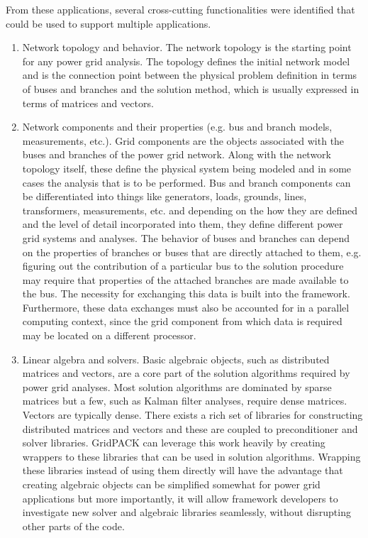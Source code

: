 From these applications, several cross-cutting functionalities were identified that could be used to support multiple applications.
\begin{enumerate}
\item  Network topology and behavior. The network topology is the starting point for any power grid analysis. The topology defines the initial network model and is the connection point between the physical problem definition in terms of buses and branches and the solution method, which is usually expressed in terms of matrices and vectors.

\item  Network components and their properties (e.g. bus and branch models, measurements, etc.). Grid components are the objects associated with the buses and branches of the power grid network. Along with the network topology itself, these define the physical system being modeled and in some cases the analysis that is to be performed. Bus and branch components can be differentiated into things like generators, loads, grounds, lines, transformers, measurements, etc. and depending on the how they are defined and the level of detail incorporated into them, they define different power grid systems and analyses. The behavior of buses and branches can depend on the properties of branches or buses that are directly attached to them, e.g. figuring out the contribution of a particular bus to the solution procedure may require that properties of the attached branches are made available to the bus. The necessity for exchanging this data is built into the framework. Furthermore, these data exchanges must also be accounted for in a parallel computing context, since the grid component from which data is required may be located on a different processor.

\item  Linear algebra and solvers. Basic algebraic objects, such as distributed matrices and vectors, are a core part of the solution algorithms required by power grid analyses. Most solution algorithms are dominated by sparse matrices but a few, such as Kalman filter analyses, require dense matrices. Vectors are typically dense. There exists a rich set of libraries for constructing distributed matrices and vectors and these are coupled to preconditioner and solver libraries. GridPACK can leverage this work heavily by creating wrappers to these libraries that can be used in solution algorithms. Wrapping these libraries instead of using them directly will have the advantage that creating algebraic objects can be simplified somewhat for power grid applications but more importantly, it will allow framework developers to investigate new solver and algebraic libraries seamlessly, without disrupting other parts of the code.


\end{enumerate}

